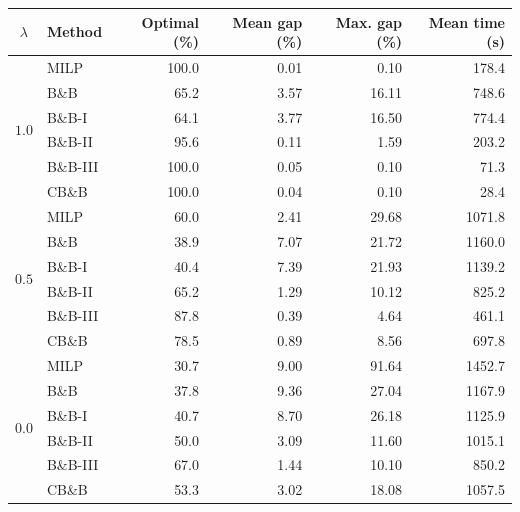 \documentclass[a4paper,fleqn]{cas-sc}
\begin{document}
\begin{center}
\begin{minipage}{\linewidth}
\centering

\label{tab:new20-gaps-times}

\setlength{\tabcolsep}{5pt}
\renewcommand{\arraystretch}{1.08}

\begin{tabular}{@{}clrrrr@{}}
\toprule
$\lambda$ & Method & Optimal (\%) & Mean gap (\%) & Max. gap (\%) & Mean time (s) \\
\midrule
\multirow{6}{*}{$1.0$}
 & MILP      & 100.0 & 0.01 & 0.10 & 178.4 \\
 & B\&B      & 65.2  & 3.57 & 16.11 & 748.6 \\
 & B\&B-I    & 64.1  & 3.77 & 16.50 & 774.4 \\
 & B\&B-II   & 95.6  & 0.11 & 1.59 & 203.2 \\
 & B\&B-III  & 100.0 & 0.05 & 0.10 & 71.3 \\
 & CB\&B     & 100.0 & 0.04 & 0.10 & 28.4 \\
\midrule
\multirow{6}{*}{$0.5$}
 & MILP      & 60.0 & 2.41 & 29.68 & 1071.8 \\
 & B\&B      & 38.9 & 7.07 & 21.72 & 1160.0 \\
 & B\&B-I    & 40.4 & 7.39 & 21.93 & 1139.2 \\
 & B\&B-II   & 65.2 & 1.29 & 10.12 & 825.2 \\
 & B\&B-III  & 87.8 & 0.39 & 4.64 & 461.1 \\
 & CB\&B     & 78.5 & 0.89 & 8.56 & 697.8 \\
\midrule
\multirow{6}{*}{$0.0$}
 & MILP      & 30.7 & 9.00 & 91.64 & 1452.7 \\
 & B\&B      & 37.8 & 9.36 & 27.04 & 1167.9 \\
 & B\&B-I    & 40.7 & 8.70 & 26.18 & 1125.9 \\
 & B\&B-II   & 50.0 & 3.09 & 11.60 & 1015.1 \\
 & B\&B-III  & 67.0 & 1.44 & 10.10 & 850.2 \\
 & CB\&B     & 53.3 & 3.02 & 18.08 & 1057.5 \\
\bottomrule
\end{tabular}
\end{minipage}
\end{center}
\end{document}
